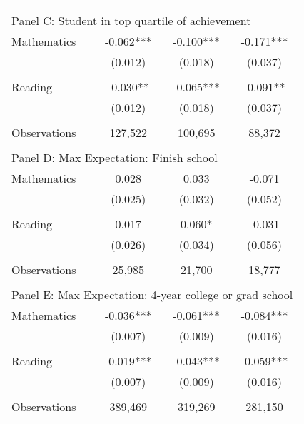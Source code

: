 {\begin{tabular}{lccc}
&  &  &   \\
\multicolumn{4}{l}{Panel C: Student in top quartile of achievement} \\
\hspace{3mm}Mathematics&      -0.062***&      -0.100***&      -0.171***\\
                    &     (0.012)   &     (0.018)   &     (0.037)   \\
 
&  &  &   \\
\hspace{3mm}Reading &      -0.030** &      -0.065***&      -0.091** \\
                    &     (0.012)   &     (0.018)   &     (0.037)   \\
                    &               &               &               \\
\hspace{3mm}Observations&     127,522   &     100,695   &      88,372   \\
 
&  &  &   \\
\multicolumn{4}{l}{Panel D: Max Expectation: Finish school} \\
\hspace{3mm}Mathematics&       0.028   &       0.033   &      -0.071   \\
                    &     (0.025)   &     (0.032)   &     (0.052)   \\
 
&  &  &   \\
\hspace{3mm}Reading &       0.017   &       0.060*  &      -0.031   \\
                    &     (0.026)   &     (0.034)   &     (0.056)   \\
                    &               &               &               \\
\hspace{3mm}Observations&      25,985   &      21,700   &      18,777   \\
 
&  &  &   \\
\multicolumn{4}{l}{Panel E: Max Expectation: 4-year college or grad school} \\
\hspace{3mm}Mathematics&      -0.036***&      -0.061***&      -0.084***\\
                    &     (0.007)   &     (0.009)   &     (0.016)   \\
 
&  &  &   \\
\hspace{3mm}Reading &      -0.019***&      -0.043***&      -0.059***\\
                    &     (0.007)   &     (0.009)   &     (0.016)   \\
                    &               &               &               \\
\hspace{3mm}Observations&     389,469   &     319,269   &     281,150   \\
 

\bottomrule
\end{tabular}
}
